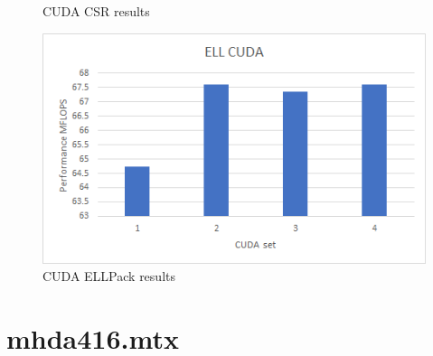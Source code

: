 \documentclass{scrreprt}
\begin{document}
\begin{figure}[ht]
\begin{minipage}[b]{0.5\linewidth}
    \caption{CUDA CSR results} 
    \vspace{4ex}
  \end{minipage}%
  \begin{minipage}[b]{0.5\linewidth}
    \centering
    \includegraphics[width=.9\linewidth]{olm100ELLCUDA.png} 
    \caption{CUDA ELLPack  results} 
    \vspace{4ex}
  \end{minipage} 
\end{figure}
\FloatBarrier




\section{mhda416.mtx}
\end{document}
